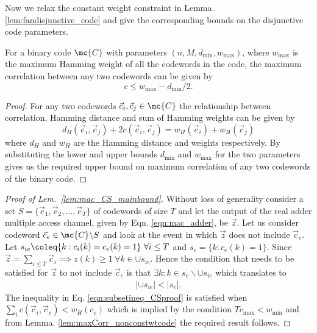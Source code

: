 \documentclass[final,onecolumn,12pt]{IEEEtran}
\def\dmin{d_{\mathrm{min}}}
\def\wmin{w_{\text{min}}}
\def\wmax{w_{\text{max}}}
\begin{document}
Now we relax the constant weight constraint in Lemma. \ref{lem:fandisjunctive_code} and give the corresponding bounds on the disjunctive code parameters.

\begin{lemma}
\label{lem:maxCorr_nonconstwtcode}
For a binary code $\mc{C}$ with parameters $(n,M,\dmin,\wmax)$, where $\wmax$ is the maximum Hamming weight of all the codewords in the code, the maximum correlation between any two codewords can be given by
\[
c\leq \wmax-\dmin/2.
\]
\end{lemma}
\begin{proof}
For any two codewords $\vec{c}_i, \vec{c}_j\in\mc{C}$ the relationship between correlation, Hamming distance and sum of Hamming weights can be given by
\[
d_H(\vec{c}_i,\vec{c}_j)+2c(\vec{c}_i,\vec{c}_j)=w_H(\vec{c}_i)+w_H(\vec{c}_j)
\]
where $d_H$ and $w_H$ are the Hamming distance and weights respectively. By substituting the lower and upper bounds $\dmin$ and $\wmax$ for the two parameters gives us the required upper bound on maximum correlation of any two codewords of the binary code.
\end{proof}
\begin{proof}[Proof of Lem.~\ref{lem:mac_CS_mainbound}]
Without loss of generality consider a set $S=\{\vec{c}_1,\vec{c}_2,\ldots, \vec{c}_T\}$ of codewords of size $T$ and let the output of the real adder multiple access channel, given by Eqn. \eqref{eqn:mac_adder}, be $\vec{z}$. Let us consider codeword $\vec{c}_e\in\mc{C}\backslash S$ and look at the event in which $\vec{z}$ does not include $\vec{c}_e$. Let $s_{ie}\coleq\{k:c_{i}(k)=c_{e}(k)=1\}~\forall i\leq T$ and  $s_{e}=\{k: c_{e}(k)=1\}$. Since $\vec{z}=\sum_{i\leq T}\vec{c}_i\implies z(k)\geq 1 ~\forall k\in \cup s_{ie}$. Hence the condition that needs to be satisfied for $\vec{z}$ to not include $\vec{c}_e$ is that $\exists k: k\in s_e\backslash \cup s_{ie}$ which translates to
\begin{align}
 |\cup s_{ie}|< |s_e|.\label{eqn:subsetineq_CSproof}
\end{align}
The inequality in Eq. \eqref{eqn:subsetineq_CSproof} is satisfied when $\sum_i c(\vec{c}_i,\vec{c}_e)<w_H(c_e)$ which is implied by the condition $Tc_{\max}<\wmin$ and from Lemma. \ref{lem:maxCorr_nonconstwtcode} the required result follows.
\end{proof}
\end{document}
